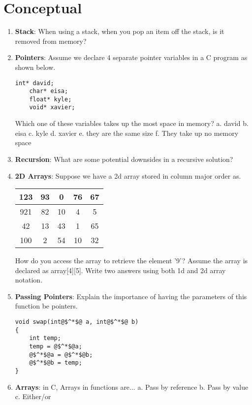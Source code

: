 \documentclass{article}
\begin{document}
\section{Conceptual}
\begin{enumerate}[label=(\alph*), itemsep = 120pt]
    \item \textbf{Stack}: When using a stack, when you pop an item off the stack, is it removed from memory?
    \item \textbf{Pointers}: Assume we declare 4 separate pointer variables in a C program as shown below.
    \begin{lstlisting}[style=CStyle]
    int* david;
    char* eisa;
    float* kyle;
    void* xavier;
    \end{lstlisting}
    Which one of these variables takes up the most space in memory?
    \newline
    a. david
    \newline
    b. eisa
    \newline
    c. kyle
    \newline
    d. xavier
    \newline
    e. they are the same size
    \newline
    f. They take up no memory space
    \item \textbf{Recursion}: What are some potential downsides in a recursive solution?
    \newpage
    \item \textbf{2D Arrays}: Suppose we have a 2d array stored in column major order as. 
    \begin{center}
    \begin{tabular}{ | c | c | c | c | c |}
    \hline
      123 & 93 & 0 & 76 & 67 \\
      \hline
      921 & 82 & 10 & 4 & 5 \\
      \hline
      42 & 13 & 43 & 1 & 65 \\
      \hline
      100 & 2 & 54 & 10 & 32 \\
      \hline
    \end{tabular}
    \end{center}
    How do you access the array to retrieve the element '9'? Assume the array is declared as array[4][5]. Write two answers using both 1d and 2d array notation.
    \item \textbf{Passing Pointers}: Explain the importance of having the parameters of this function be pointers.
    
    \begin{lstlisting}[style=CStyle]
void swap(int@$^*$@ a, int@$^*$@ b)
{
    int temp;
    temp = @$^*$@a;
    @$^*$@a = @$^*$@b;
    @$^*$@b = temp;
} \end{lstlisting}
\item \textbf{Arrays}: in C, Arrays in functions are...
\newline
a. Pass by reference 
\newline
b. Pass by value
\newline
c. Either/or


\end{enumerate}
\end{document}
